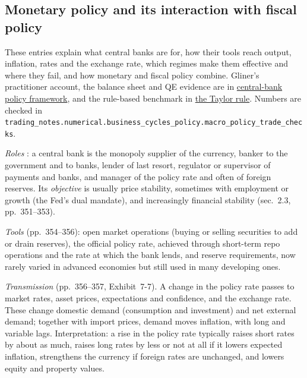 \subsection{Monetary policy and its interaction with fiscal policy}

These entries explain what central banks are for, how their tools reach output, inflation, rates and the exchange rate, which regimes make them effective and where they fail, and how monetary and fiscal policy combine. Gliner's practitioner account, the balance sheet and QE evidence are in \hyperref[def:central-bank-policy-framework]{central-bank policy framework}, and the rule-based benchmark in \hyperref[mod:taylor-rule]{the Taylor rule}. Numbers are checked in \nolinkurl{trading_notes.numerical.business_cycles_policy.macro_policy_trade_checks}.

\begin{qfdefinition}\label{def:monetary-policy-transmission-regimes}
 \emph{Roles} \citep[chap.~7, sec.~2.2, pp.~348--350]{economics-investment-decision-makers-2013}: a central bank is the monopoly supplier of the currency, banker to the government and to banks, lender of last resort, regulator or supervisor of payments and banks, and manager of the policy rate and often of foreign reserves. Its \emph{objective} is usually price stability, sometimes with employment or growth (the Fed's dual mandate), and increasingly financial stability (sec.~2.3, pp.~351--353).

\emph{Tools} (pp.~354--356): open market operations (buying or selling securities to add or drain reserves), the official policy rate, achieved through short-term repo operations and the rate at which the bank lends, and reserve requirements, now rarely varied in advanced economies but still used in many developing ones.

\emph{Transmission} (pp.~356--357, Exhibit~7-7). A change in the policy rate passes to market rates, asset prices, expectations and confidence, and the exchange rate. These change domestic demand (consumption and investment) and net external demand; together with import prices, demand moves inflation, with long and variable lags. Interpretation: a rise in the policy rate typically raises short rates by about as much, raises long rates by less or not at all if it lowers expected inflation, strengthens the currency if foreign rates are unchanged, and lowers equity and property values.


\end{qfdefinition}

